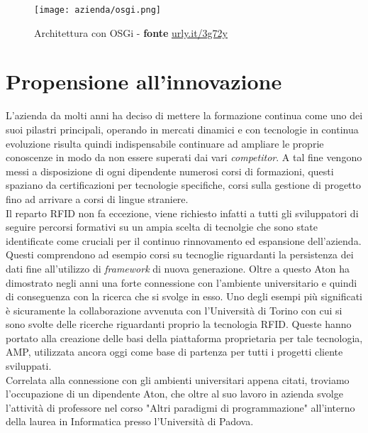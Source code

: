 \begin{figure}[!h] 
    \centering 
    \texttt{[image: azienda/osgi.png]} 
    \caption{Architettura con OSGi - \textbf{fonte} \url{urly.it/3g72y}}
    \label{osgi_example}
\end{figure}

\section{Propensione all'innovazione}

L'azienda da molti anni ha deciso di mettere la formazione continua come uno dei suoi pilastri principali, operando in mercati dinamici e con tecnologie in
continua evoluzione risulta quindi indispensabile continuare ad ampliare le proprie conoscenze in modo da non essere superati dai vari \emph{competitor}.
A tal fine vengono messi a disposizione di ogni dipendente numerosi corsi di formazioni, questi spaziano da certificazioni per tecnologie specifiche, corsi
sulla gestione di progetto fino ad arrivare a corsi di lingue straniere. \\
Il reparto RFID non fa eccezione, viene richiesto infatti a tutti gli sviluppatori di seguire percorsi formativi su un ampia scelta di tecnolgie che sono state
identificate come cruciali per il continuo rinnovamento ed espansione dell'azienda. Questi comprendono ad esempio corsi su tecnoglie riguardanti la persistenza
dei dati fine all'utilizzo di \emph{framework} di nuova generazione.
Oltre a questo Aton ha dimostrato negli anni una forte connessione con l'ambiente universitario e quindi di conseguenza con la ricerca che si svolge in esso.
Uno degli esempi più significati è sicuramente la collaborazione avvenuta con l'Università di Torino con cui si sono svolte delle ricerche riguardanti proprio
la tecnologia RFID. Queste hanno portato alla creazione delle basi della piattaforma proprietaria per tale tecnologia, AMP, utilizzata ancora oggi come base di
partenza per tutti i progetti cliente sviluppati. \\
Correlata alla connessione con gli ambienti universitari appena citati, troviamo l'occupazione di un dipendente Aton, che oltre al suo lavoro in azienda svolge
l'attività di professore nel corso "Altri paradigmi di programmazione" all'interno della laurea in Informatica presso l'Università di Padova. 


